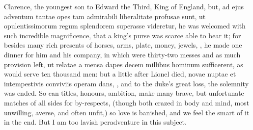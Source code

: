 {Clarence, the youngest son to Edward the Third, King of England, but,
ad ejus adventum tantae opes tam admirabili liberalitate profusae sunt,
ut opulentissimorum regum splendorem superasse videretur, he was
welcomed with such incredible magnificence, that a king's purse was
scarce able to bear it; for besides many rich presents of horses, arms,
plate, money, jewels, \etc{}, he made one dinner for him and his company,
in which were thirty-two messes and as much provision left, ut relatae
a mensa dapes decem millibus hominum sufficerent, as would serve ten
thousand men: but a little after Lionel died, novae nuptae et
intempestivis conviviis operam dans, \etc{}, and to the duke's great loss,
the solemnity was ended. So can titles, honours, ambition, make many
brave, but unfortunate matches of all sides for by-respects, (though
both crazed in body and mind, most unwilling, averse, and often unfit,)
so love is banished, and we feel the smart of it in the end. But I am
too lavish peradventure in this subject.

}
